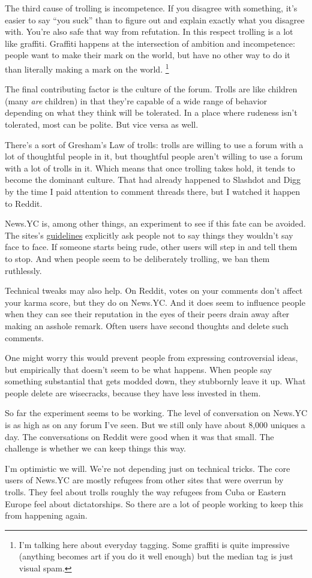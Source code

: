 The third cause of trolling is incompetence. If you disagree with
something, it's easier to say ``you suck'' than to figure out and
explain exactly what you disagree with. You're also safe that way from
refutation. In this respect trolling is a lot like graffiti. Graffiti
happens at the intersection of ambition and incompetence: people want to
make their mark on the world, but have no other way to do it than
literally making a mark on the world. \footnote{I'm talking here about everyday tagging. Some graffiti is quite
impressive (anything becomes art if you do it well enough) but the
median tag is just visual spam.}

The final contributing factor is the culture of the forum. Trolls are
like children (many \emph{are} children) in that they're capable of a
wide range of behavior depending on what they think will be tolerated.
In a place where rudeness isn't tolerated, most can be polite. But vice
versa as well.

There's a sort of Gresham's Law of trolls: trolls are willing to use a
forum with a lot of thoughtful people in it, but thoughtful people
aren't willing to use a forum with a lot of trolls in it. Which means
that once trolling takes hold, it tends to become the dominant culture.
That had already happened to Slashdot and Digg by the time I paid
attention to comment threads there, but I watched it happen to Reddit.

News.YC is, among other things, an experiment to see if this fate can be
avoided. The sites's
\href{http://ycombinator.com/newsguidelines.html}{guidelines} explicitly
ask people not to say things they wouldn't say face to face. If someone
starts being rude, other users will step in and tell them to stop. And
when people seem to be deliberately trolling, we ban them ruthlessly.

Technical tweaks may also help. On Reddit, votes on your comments don't
affect your karma score, but they do on News.YC. And it does seem to
influence people when they can see their reputation in the eyes of their
peers drain away after making an asshole remark. Often users have second
thoughts and delete such comments.

One might worry this would prevent people from expressing controversial
ideas, but empirically that doesn't seem to be what happens. When people
say something substantial that gets modded down, they stubbornly leave
it up. What people delete are wisecracks, because they have less
invested in them.

So far the experiment seems to be working. The level of conversation on
News.YC is as high as on any forum I've seen. But we still only have
about 8,000 uniques a day. The conversations on Reddit were good when it
was that small. The challenge is whether we can keep things this way.

I'm optimistic we will. We're not depending just on technical tricks.
The core users of News.YC are mostly refugees from other sites that were
overrun by trolls. They feel about trolls roughly the way refugees from
Cuba or Eastern Europe feel about dictatorships. So there are a lot of
people working to keep this from happening again.